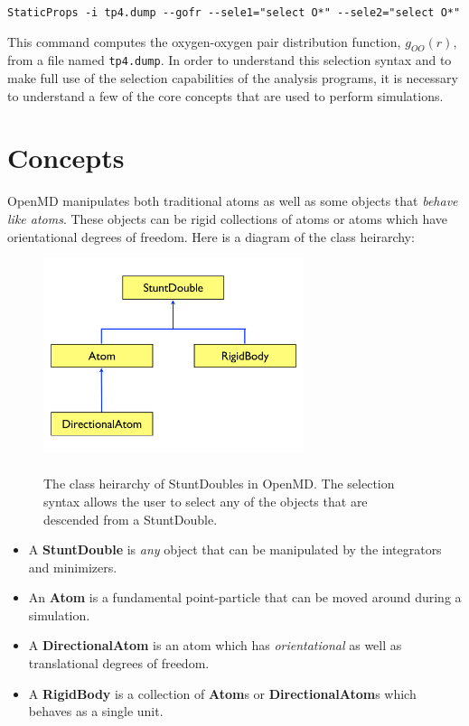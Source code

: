 \documentclass[]{book}
\begin{document}
{\tt StaticProps -i tp4.dump -{}-gofr  -{}-sele1="select O*"  -{}-sele2="select O*"}

This command computes the oxygen-oxygen pair distribution function,
$g_{OO}(r)$, from a file named {\tt tp4.dump}.  In order to understand
this selection syntax and to make full use of the selection
capabilities of the analysis programs, it is necessary to understand a
few of the core concepts that are used to perform simulations. 

\section{\label{section:concepts}Concepts}

{\sc OpenMD} manipulates both traditional atoms as well as some objects that
{\it behave like atoms}.  These objects can be rigid collections of
atoms or atoms which have orientational degrees of freedom.  Here is a
diagram of the class heirarchy:

\begin{figure}
\centering
\includegraphics[width=3in]{heirarchy.pdf}
\caption[Class heirarchy for StuntDoubles in {\sc OpenMD}]{ \\ The
class heirarchy of StuntDoubles in {\sc OpenMD}. The selection
syntax allows the user to select any of the objects that are descended
from a StuntDouble.}
\label{fig:heirarchy}
\end{figure}

\begin{itemize}
\item A {\bf StuntDouble} is {\it any} object that can be manipulated by the
integrators and minimizers. 
\item An {\bf Atom} is a fundamental point-particle that can be moved around during a simulation.
\item A {\bf DirectionalAtom} is an atom which has {\it orientational} as well as translational degrees of freedom.
\item A {\bf RigidBody} is a collection of {\bf Atom}s or {\bf
DirectionalAtom}s which behaves as a single unit.
\end{itemize} 
\end{document}
